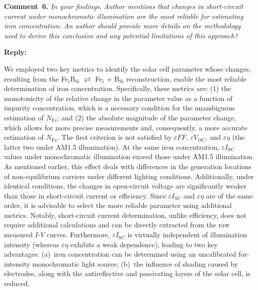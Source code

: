 \documentclass[a4paper,fleqn]{cas-sc}
\begin{document}
\vspace{1cm}
\noindent
\textcolor[rgb]{0.00,0.50,1.00}{\textbf{Comment~6.}}
\emph{In your findings, Author mentions that changes in short-circuit current under monochromatic illumination are the most
reliable for estimating iron concentration.
An author should provide more details on the methodology used to derive this conclusion and any potential limitations of this approach?}



\noindent
\textcolor[rgb]{0.51,0.00,0.00}{\textbf{Reply:}}

We employed two key metrics to identify the solar cell parameter whose changes,
resulting from the Fe$_i$B$_\mathrm{Si}$ $\rightleftarrows$ Fe$_i$ + B$_\mathrm{Si}$ reconstruction,
enable the most reliable determination of iron concentration.
Specifically, these metrics are:
(1) the monotonicity of the relative change in the parameter value as a function of impurity concentration,
which is a necessary condition for the unambiguous estimation of $N_\mathrm{Fe}$;
and (2) the absolute magnitude of the parameter change, which allows for more precise measurements and,
consequently, a more accurate estimation of $N_\mathrm{Fe}$.
The first criterion is not satisfied by $\varepsilon F\!F$, $\varepsilon V_\mathrm{OC}$, and $\varepsilon \eta$
(the latter two under AM1.5 illumination).
At the same iron concentration, $\varepsilon I_\mathrm{SC}$ values under monochromatic illumination exceed those under AM1.5 illumination.
As mentioned earlier, this effect deals with differences in the generation locations
of non-equilibrium carriers under different lighting conditions.
Additionally, under identical conditions, the changes in open-circuit voltage are significantly weaker
than those in short-circuit current or efficiency.
Since $\varepsilon I_\mathrm{SC}$ and $\varepsilon \eta$ are of the same order,
it is advisable to select the more reliable parameter using additional metrics.
Notably, short-circuit current determination, unlike efficiency, does not require additional calculations
and can be directly extracted from the raw measured $I$-$V$ curves.
Furthermore, $\varepsilon I_\mathrm{SC}$ is virtually independent of illumination intensity
(whereas $\varepsilon \eta$ exhibits a weak dependence), leading to two key advantages:
(a)~iron concentration can be determined using an uncalibrated for-intensity monochromatic light source;
(b)~the influence of shading caused by electrodes, along with the antireflective and passivating layers of the solar cell, is reduced.
\end{document}
